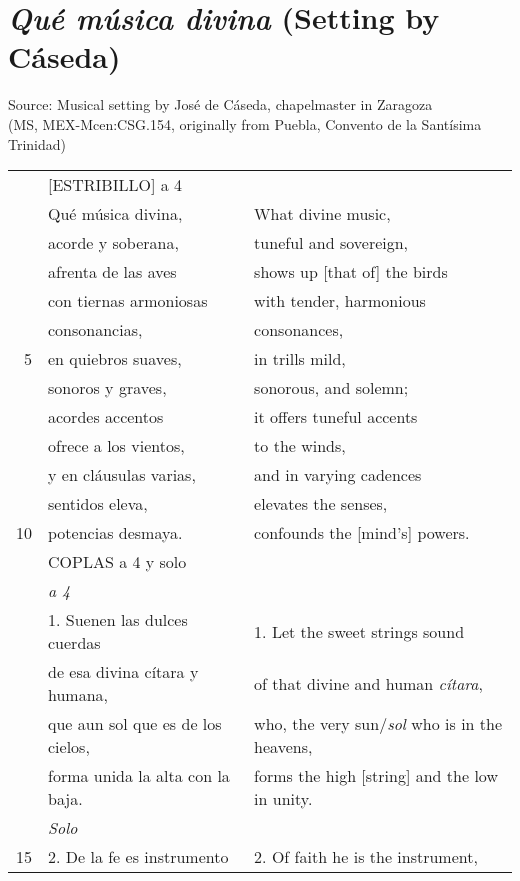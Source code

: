 \section{%
\emph{Qué música divina} (Setting by Cáseda)}

Source: Musical setting by José de Cáseda, chapelmaster in Zaragoza\\
(MS, MEX-Mcen:CSG.154, originally from Puebla, Convento de la Santísima Trinidad)

\vspace{\baselineskip}

\begin{tabular}{rll}
%
& [ESTRIBILLO] a 4 			& 	\\ [1ex]
%
& Qué música divina,			&	What divine music,\\
& acorde y soberana,			&	tuneful and sovereign,\\
& afrenta de las aves			&	shows up [that of] the birds\\
& con tiernas armoniosas		& with tender, harmonious\\ 
& \tabindent consonancias,		&	\tabindent consonances,\\
5 & en quiebros suaves,			& in trills mild,\\ 
& \tabindent sonoros y graves,	&	sonorous, and solemn;\\
& acordes accentos			&	it offers tuneful accents\\
& ofrece a los vientos,		&	to the winds,\\
& y en cláusulas varias,		&	and in varying cadences\\
& sentidos eleva,				&	elevates the senses,\\
10 & potencias desmaya.			&	confounds the [mind's] powers.\\
%
& COPLAS a 4 y solo 			& 	\\ [1ex]
& \emph{a 4} 				& 	\\ 
& 1. Suenen las dulces cuerdas		&	1. Let the sweet strings sound\\
& de esa divina cítara y humana,		&	of that divine and human \emph{cítara},\\
& que aun sol que es de los cielos,	&	who, the very sun/\emph{sol} who is in the heavens,\\
& forma unida la alta con la baja.	&	forms the high [string] and the low in unity.\\ [1ex]
%
& \emph{Solo} 				& 	\\
15 & 2. De la fe es instrumento			&	2. Of faith he is the instrument,\\

\end{tabular}
